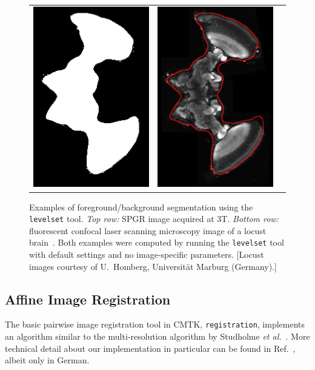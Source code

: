 \documentclass{InsightArticle}
\begin{document}
\begin{figure}[tb]
\begin{center}
\begin{tabular}{ccc}
\includegraphics[width=.3\linewidth]{img/levelset_locust_mask}&
\includegraphics[width=.3\linewidth]{img/levelset_locust_ovl}
\end{tabular}
\end{center}
\caption{Examples of foreground/background segmentation using the {\tt
levelset} tool. {\em Top row:\/} SPGR image acquired at 3T. {\em Bottom
row:\/} fluorescent confocal laser scanning microscopy image of a locust
brain~\cite{KuryRohlKrof:2008}. Both examples were computed by running the
{\tt levelset} tool with default settings and no image-specific
parameters. [Locust images courtesy of U.~Homberg, Universit\"at Marburg
(Germany).]  }
\label{fig:Levelset}
\end{figure}

\subsection{Affine Image Registration}

The basic pairwise image registration tool in CMTK, \verb|registration|,
implements an algorithm similar to the multi-resolution algorithm by Studholme
{\em et al.\/}~\cite{StudHillHawk:1997}. More technical detail about our
implementation in particular can be found in Ref.~\cite{Rohlfing:2000}, albeit
only in German.
\end{document}
